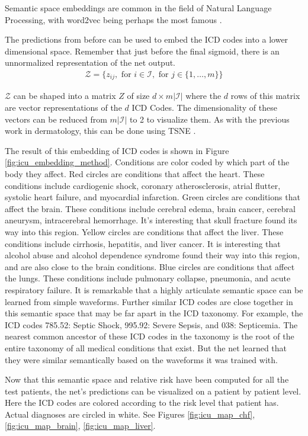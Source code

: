 Semantic space embeddings are common in the field of Natural Language Processing, with word2vec being perhaps the most famous \cite{mikolov2013efficient}.

The predictions from before can be used to embed the ICD codes into a lower dimensional space. Remember that just before the final sigmoid, there is an unnormalized representation of the net output.
\begin{gather}
    \mathcal{Z} = \{
        z_{ij},
        \text{ for } i \in \mathcal{I},
        \text{ for } j \in \{ 1, \dots, m \}
    \}
\end{gather}

$\mathcal{Z}$ can be shaped into a matrix $Z$ of size $d \times m |\mathcal{I}|$ where the $d$ rows of this matrix are vector representations of the $d$ ICD Codes.  The dimensionality of these vectors can be reduced from $m |\mathcal{I}|$ to 2 to visualize them.  As with the previous work in dermatology, this can be done using TSNE \cite{van2008visualizing}.

The result of this embedding of ICD codes is shown in Figure \ref{fig:icu_embedding_method}. Conditions are color coded by which part of the body they affect.  Red circles are conditions that affect the heart.  These conditions include cardiogenic shock, coronary atherosclerosis, atrial flutter, systolic heart failure, and myocardial infarction.  Green circles are conditions that affect the brain.  These conditions include cerebral edema, brain cancer, cerebral aneurysm, intracerebral hemorrhage.  It’s interesting that skull fracture found its way into this region.  Yellow circles are conditions that affect the liver.  These conditions include cirrhosis, hepatitis, and liver cancer.  It is interesting that alcohol abuse and alcohol dependence syndrome found their way into this region, and are also close to the brain conditions.  Blue circles are conditions that affect the lungs.  These conditions include pulmonary collapse, pneumonia, and acute respiratory failure.  It is remarkable that a highly articulate semantic space can be learned from simple waveforms.  Further similar ICD codes are close together in this semantic space that may be far apart in the ICD taxonomy.  For example, the ICD codes 785.52: Septic Shock, 995.92: Severe Sepsis, and 038: Septicemia.  The nearest common ancestor of these ICD codes in the taxonomy is the root of the entire taxonomy of all medical conditions that exist.  But the net learned that they were similar semantically based on the waveforms it was trained with.

Now that this semantic space and relative risk have been computed for all the test patients, the net's predictions can be visualized on a patient by patient level.  Here the ICD codes are colored according to the risk level that patient has.  Actual diagnoses are circled in white.  See Figures \ref{fig:icu_map_chf}, \ref{fig:icu_map_brain}, \ref{fig:icu_map_liver}.

\figIcuIcdMap
\figIcuMaps